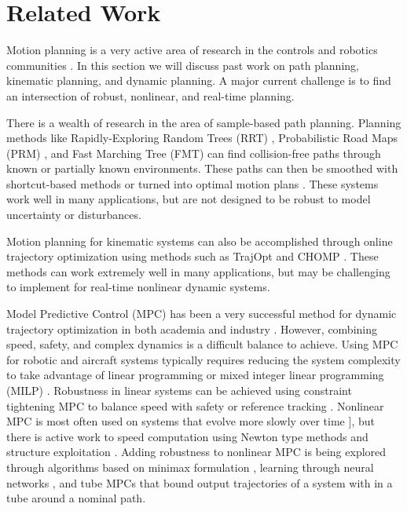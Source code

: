 \section{Related Work \label{sec:relatedwork}}
Motion planning is a very active area of research in the controls and robotics communities \cite{Hoy2015}.  In this section we will discuss past work on path planning, kinematic planning, and dynamic planning.  A major current challenge is to find an intersection of robust, nonlinear, and real-time planning. 

There is a wealth of research in the area of sample-based path planning.  Planning methods like Rapidly-Exploring Random Trees (RRT) \cite{Kuffner2000}, Probabilistic Road Maps (PRM) \cite{Kavraki1996}, and Fast Marching Tree (FMT) \cite{Janson2015} can find collision-free paths through known or partially known environments.  These paths can then be smoothed with shortcut-based methods or turned into optimal motion plans \cite{Richter2016, Karaman2011, Kobilarov2012}.  These systems work well in many applications, but are not designed to be robust to model uncertainty or disturbances.

Motion planning for kinematic systems can also be accomplished through online trajectory optimization using methods such as TrajOpt \cite{Schulman2013} and CHOMP \cite{Ratliff2009}. These methods can work extremely well in many applications, but may be challenging to implement for real-time nonlinear dynamic systems.

Model Predictive Control (MPC) has been a very successful method for dynamic trajectory optimization in both academia and industry \cite{Qin2003}.  However, combining speed, safety, and complex dynamics is a difficult balance to achieve. Using MPC for robotic and aircraft systems typically requires reducing the system complexity to take advantage of linear programming or mixed integer linear programming (MILP) \cite{Alexis2016, Bellingham2002, Vitus2008, Zeilinger2011, Richter2012}. Robustness in linear systems can be achieved using constraint tightening MPC to balance speed with safety \cite{Kuwata2007, Richards2006} or reference tracking \cite{DiCairano2016}. Nonlinear MPC is most often used on systems that evolve more slowly over time \cite{Diehl2002, Schildbach2016}], but there is active work to speed computation using Newton type methods and structure exploitation \cite{Diehl2009,Findeisen2007, Grune2011, Quirynen2015, Gupta2015, Neunert2016, Torrisi2016}. Adding robustness to nonlinear MPC is being explored through algorithms based on minimax formulation \cite{Lofberg2003, Kumar2014}, learning through neural networks \cite{Yan2014}, and tube MPCs \cite{Mayne2011, Cannon2011, Kumar2014, Gao2014} that bound output trajectories of a system with in a tube around a nominal path.

